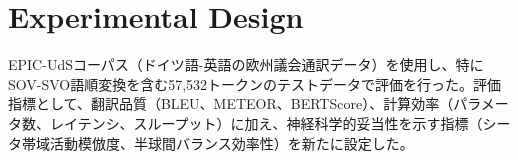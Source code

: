 \section{Experimental Design}

EPIC-UdSコーパス（ドイツ語-英語の欧州議会通訳データ）を使用し、特にSOV-SVO語順変換を含む57,532トークンのテストデータで評価を行った。評価指標として、翻訳品質（BLEU、METEOR、BERTScore）、計算効率（パラメータ数、レイテンシ、スループット）に加え、神経科学的妥当性を示す指標（シータ帯域活動模倣度、半球間バランス効率性）を新たに設定した。
